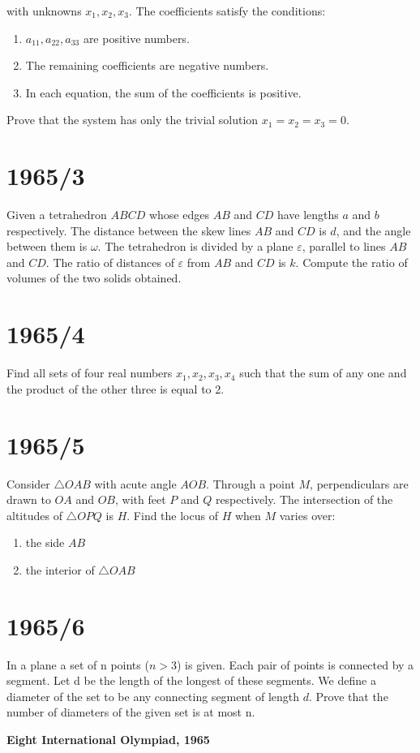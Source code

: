 \documentclass[12pt]{article}
\begin{document}
with unknowns \(x_1, x_2, x_3\). The coefficients satisfy the conditions:

\begin{enumerate}
\renewcommand{\labelenumi}{(\alph{enumi})}
\item \(a_{11}, a_{22}, a_{33}\) are positive numbers.
\item The remaining coefficients are negative numbers.
\item In each equation, the sum of the coefficients is positive.
\end{enumerate}

Prove that the system has only the trivial solution \(x_1 = x_2 = x_3 = 0\).

\section*{ 1965/3}
Given a tetrahedron \(ABCD\) whose edges \(AB\) and \(CD\) have lengths \(a\) and \(b\) respectively. The distance between the skew lines \(AB\) and \(CD\) is \(d\), and the angle between them is \(\omega\). The tetrahedron is divided by a plane \(\varepsilon\), parallel to lines \(AB\) and \(CD\). The ratio of distances of \(\varepsilon\) from \(AB\) and \(CD\) is \(k\). Compute the ratio of volumes of the two solids obtained.

\section*{1965/4}
Find all sets of four real numbers \(x_1, x_2, x_3, x_4\) such that the sum of any one and the product of the other three is equal to 2.

\section*{1965/5}
Consider \(\triangle OAB\) with acute angle \(AOB\). Through a point \(M\), perpendiculars are drawn to \(OA\) and \(OB\), with feet \(P\) and \(Q\) respectively. The intersection of the altitudes of \(\triangle OPQ\) is \(H\). Find the locus of \(H\) when \(M\) varies over:
\begin{enumerate}
\item the side \(AB\)
\item the interior of \(\triangle OAB\)
\end{enumerate}
\section*{1965/6}
In a plane a set of n points ($n > 3$) is given. Each pair of points is connected by a segment. Let d be the length of the longest of these segments. We define a diameter of the set to be any connecting segment of length \(d\). Prove that the number of diameters of the given set is at most n.
\newpage
\begin{center}
{\fontsize{24}{28}\selectfont
\textbf{Eight International Olympiad, 1965}
}
\end{center}
\end{document}
